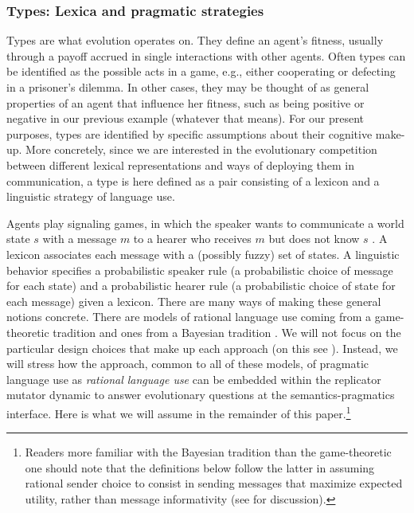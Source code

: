 \documentclass[a4paper, 11pt]{article}
\theoremstyle{Satz}
\begin{document}
\subsubsection{Types: Lexica and pragmatic strategies}
\label{sec:languages+use}
Types are what evolution operates on. They define an agent's fitness, usually through a payoff
accrued in single interactions with other agents. Often types can be identified as the possible
acts in a game, e.g., either cooperating or defecting in a prisoner's dilemma. In other cases,
they may be thought of as general properties of an agent that influence her fitness, such as
being positive or negative in our previous example (whatever that means). For our present
purposes, types are identified by specific assumptions about their cognitive
make-up. More concretely, since we are interested in the evolutionary competition between different lexical representations and ways of deploying them in communication, a type is here defined as a pair consisting of a lexicon and a linguistic strategy of language use.

Agents play signaling games, in which the speaker wants to communicate a world state $s$ with a
message $m$ to a hearer who receives $m$ but does not know $s$
\citep[e.g.][]{lewis:1969,Skyrms2010:Signals}. A lexicon associates each message with a
(possibly fuzzy) set of states. A linguistic behavior specifies a probabilistic speaker
rule (a probabilistic choice of message for each state) and a probabilistic hearer rule (a
probabilistic choice of state for each message) given a lexicon. There are many ways of making these general notions concrete. There are models of rational language use coming from a game-theoretic tradition \citep[e.g.,][]{benz:2006,benz+vRooij:2007,jaeger:2007b,franke+jaeger:2014} and ones from a Bayesian tradition \citep[e.g.,][]{frank+goodman:2012,goodman+stuhlmueller:2013,GoodmanFrank2016:Pragmatic-Langu}. We will not focus on the particular design choices that make up each approach (on this see \citealt{qing+franke:2015}). Instead, we will stress how the approach, common to all of these models, of pragmatic language use as {\em rational language use} can be embedded within the replicator mutator dynamic to answer evolutionary questions at the semantics-pragmatics interface. Here is what we will assume in the remainder of this paper.\footnote{Readers more familiar with the Bayesian tradition than the game-theoretic one should note that the definitions below follow the latter in assuming rational sender choice to consist in sending messages that maximize expected utility, rather than message informativity (see \citealt{qing+franke:2015} for discussion).}
\end{document}
